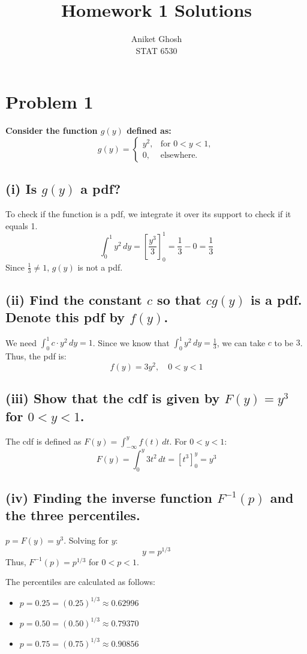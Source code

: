 \documentclass[12pt]{article}
\title{Homework 1 Solutions}
\author{Aniket Ghosh \\ STAT 6530}
\begin{document}
\maketitle

\section*{Problem 1}
\textbf{Consider the function $g(y)$ defined as:}
\[ g(y) = \begin{cases} y^2, & \text{for } 0 < y < 1, \\ 0, & \text{elsewhere.} \end{cases} \]

\subsection*{(i) Is $g(y)$ a pdf?}
To check if the function is a pdf, we integrate it over its support to check if it equals 1.
\[ \int_{0}^{1} y^2 \, dy = \left[ \frac{y^3}{3} \right]_0^1 = \frac{1}{3} - 0 = \frac{1}{3} \]
Since $\frac{1}{3} \neq 1$, $g(y)$ is not a pdf.

\subsection*{(ii) Find the constant $c$ so that $cg(y)$ is a pdf. Denote this pdf by $f(y)$.}
We need $\int_{0}^{1} c \cdot y^2 \, dy = 1$. Since we know that $\int_{0}^{1} y^2 \, dy = \frac{1}{3}$, we can take $c$ to be $3$.
Thus, the pdf is:
\[ f(y) = 3y^2, \quad 0 < y < 1 \]

\subsection*{(iii) Show that the cdf is given by $F(y) = y^3$ for $0 < y < 1$.}
The cdf is defined as $F(y) = \int_{-\infty}^{y} f(t) \, dt$.
For $0 < y < 1$:
\[ F(y) = \int_{0}^{y} 3t^2 \, dt = \left[ t^3 \right]_0^y = y^3 \]

\subsection*{(iv) Finding the inverse function $F^{-1}(p)$ and the three percentiles.}
$p = F(y) = y^3$. Solving for $y$:
\[ y = p^{1/3} \]
Thus, $F^{-1}(p) = p^{1/3}$ for $0 < p < 1$.

\noindent The percentiles are calculated as follows:
\begin{itemize}
    \item \textbf{ $p=0.25 = (0.25)^{1/3} \approx 0.62996$}
    \item \textbf{ $p=0.50 = (0.50)^{1/3} \approx 0.79370$}
    \item \textbf{ $p=0.75 = (0.75)^{1/3} \approx 0.90856$}
\end{itemize}
\end{document}
